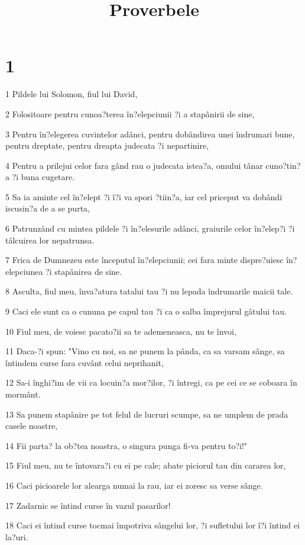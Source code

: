 

\title{Proverbele}


\chapter{1}

\par 1 Pildele lui Solomon, fiul lui David,
\par 2 Folositoare pentru cunoa?terea în?elepciunii ?i a stapânirii de sine,
\par 3 Pentru în?elegerea cuvintelor adânci, pentru dobândirea unei îndrumari bune, pentru dreptate, pentru dreapta judecata ?i nepartinire,
\par 4 Pentru a prilejui celor fara gând rau o judecata istea?a, omului tânar cuno?tin?a ?i buna cugetare.
\par 5 Sa ia aminte cel în?elept ?i î?i va spori ?tiin?a, iar cel priceput va dobândi iscusin?a de a se purta,
\par 6 Patrunzând cu mintea pildele ?i în?elesurile adânci, graiurile celor în?elep?i ?i tâlcuirea lor nepatrunsa.
\par 7 Frica de Dumnezeu este începutul în?elepciunii; cei fara minte dispre?uiesc în?elepciunea ?i stapânirea de sine.
\par 8 Asculta, fiul meu, înva?atura tatalui tau ?i nu lepada îndrumarile maicii tale.
\par 9 Caci ele sunt ca o cununa pe capul tau ?i ca o salba împrejurul gâtului tau.
\par 10 Fiul meu, de voiesc pacato?ii sa te ademeneasca, nu te învoi,
\par 11 Daca-?i spun: "Vino cu noi, sa ne punem la pânda, ca sa varsam sânge, sa întindem curse fara cuvânt celui neprihanit,
\par 12 Sa-i înghi?im de vii ca locuin?a mor?ilor, ?i întregi, ca pe cei ce se coboara în mormânt.
\par 13 Sa punem stapânire pe tot felul de lucruri scumpe, sa ne umplem de prada casele noastre,
\par 14 Fii parta? la ob?tea noastra, o singura punga fi-va pentru to?i!"
\par 15 Fiul meu, nu te întovara?i cu ei pe cale; abate piciorul tau din cararea lor,
\par 16 Caci picioarele lor alearga numai la rau, iar ei zoresc sa verse sânge.
\par 17 Zadarnic se întind curse în vazul pasarilor!
\par 18 Caci ei întind curse tocmai împotriva sângelui lor, ?i sufletului lor î?i întind ei la?uri.
